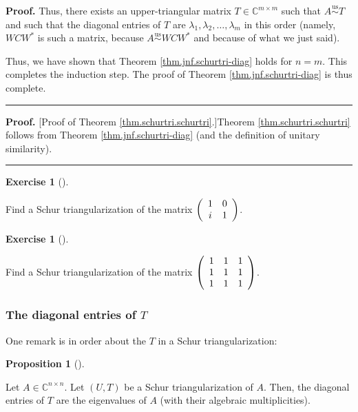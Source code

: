 \documentclass[numbers=enddot,12pt,final,onecolumn,notitlepage]{scrartcl}%
\newcounter{exer}
\numberwithin{exer}{subsection}
\theoremstyle{definition}
\newtheorem{prop}[theo]{Proposition}
\newenvironment{proposition}[1][]
{\begin{prop}[#1]\begin{leftbar}}
{\end{leftbar}\end{prop}}
\newtheorem{exmp}[exer]{Exercise}
\newenvironment{exercise}[1][]
{\begin{exmp}[#1]\begin{leftbar}}
{\end{leftbar}\end{exmp}}
\newenvironment{proof}[1][Proof]{\noindent\textbf{#1.} }{\ \rule{0.5em}{0.5em}}
\begin{document}
\begin{proof}
Thus, there exists an upper-triangular matrix $T\in\mathbb{C}^{m\times m}$
such that $A\overset{\operatorname*{us}}{\sim}T$ and such that the diagonal
entries of $T$ are $\lambda_{1},\lambda_{2},\ldots,\lambda_{m}$ in this order
(namely, $WCW^{\ast}$ is such a matrix, because $A\overset{\operatorname*{us}%
}{\sim}WCW^{\ast}$ and because of what we just said).

Thus, we have shown that Theorem \ref{thm.jnf.schurtri-diag} holds for $n=m$.
This completes the induction step. The proof of Theorem
\ref{thm.jnf.schurtri-diag} is thus complete.
\end{proof}

\begin{proof}
[Proof of Theorem \ref{thm.schurtri.schurtri}.]Theorem
\ref{thm.schurtri.schurtri} follows from Theorem \ref{thm.jnf.schurtri-diag}
(and the definition of unitary similarity).
\end{proof}

\begin{exercise}
\label{exe.schurtri.schurtri.one2x2} Find a Schur triangularization of
the matrix $\left(
\begin{array}
[c]{cc}%
1 & 0\\
i & 1
\end{array}
\right)  $.
\end{exercise}

\begin{exercise}
\label{exe.schurtri.schurtri.one3x3} Find a Schur triangularization of
the matrix $\left(
\begin{array}
[c]{ccc}%
1 & 1 & 1\\
1 & 1 & 1\\
1 & 1 & 1
\end{array}
\right)  $.
\end{exercise}

\subsubsection{The diagonal entries of $T$}

One remark is in order about the $T$ in a Schur triangularization:

\begin{proposition}
\label{prop.schurtri.schurtri.T-diag}Let $A\in\mathbb{C}^{n\times n}$. Let
$\left(  U,T\right)  $ be a Schur triangularization of $A$. Then, the diagonal
entries of $T$ are the eigenvalues of $A$ (with their algebraic multiplicities).
\end{proposition}
\end{document}
